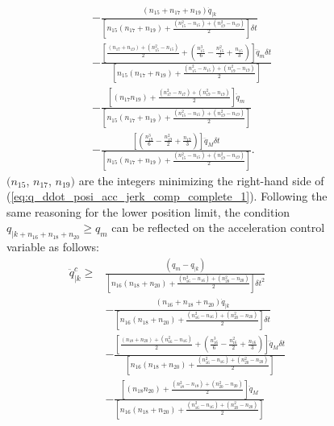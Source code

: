 \begin{figure}[!htbp]
\begin{equation}
\begin{split}
&- \frac{\left(n_{15}+n_{17}+n_{19}\right)\dot{q}_{|k}}{\left[n_{15}\left(n_{17}+n_{19}\right)+\frac{\left(n_{15}^2-n_{15}\right)+\left(n_{19}^2-n_{19}\right)}{2}\right]\delta t} \\
&- \frac{\left[\frac{\left(n_{17}+n_{19}\right)+\left(n_{15}^2-n_{15}\right)}{2}+\left(\frac{n_{15}^3}{6}-\frac{n_{15}^2}{2}+\frac{n_{15}}{3}\right)\right]\dddot{q}_{m} \delta t}{\left[n_{15}\left(n_{17}+n_{19}\right)+\frac{\left(n_{15}^2-n_{15}\right)+\left(n_{19}^2-n_{19}\right)}{2}\right]} \\
&- \frac{\left[\left(n_{17} n_{19}\right)+\frac{\left(n_{17}^2-n_{17}\right)+\left(n_{19}^2-n_{19}\right)}{2}\right]\ddot{q}_{m}}{\left[n_{15}\left(n_{17}+n_{19}\right)+\frac{\left(n_{15}^2-n_{15}\right)+\left(n_{19}^2-n_{19}\right)}{2}\right]} \\
&- \frac{\left[\left(\frac{n_{19}^3}{6}-\frac{n_{19}^2}{2}+\frac{n_{19}}{3}\right)\right]\dddot{q}_{M} \delta t}{\left[n_{15}\left(n_{17}+n_{19}\right)+\frac{\left(n_{15}^2-n_{15}\right)+\left(n_{19}^2-n_{19}\right)}{2}\right]}.
\end{split}
\label{eq:q_ddot_posi_acc_jerk_comp_complete_1}
\end{equation} 
$(n_{15}$, $n_{17}$, $n_{19})$ are the integers minimizing the right-hand side of (\ref{eq:q_ddot_posi_acc_jerk_comp_complete_1}).
Following the same reasoning for the lower position limit, the condition $q_{|k+n_{16}+n_{18}+n_{20}} \geq q_{m}$ can be reflected on the acceleration control variable as follows:
\begin{equation}
\begin{split}
\ddot{q}_{|k}^{c} \geq &\frac{\left(q_{m}-q_{|k}\right)}{\left[n_{16}\left(n_{18}+n_{20}\right)+\frac{\left(n_{16}^2-n_{16}\right)+\left(n_{20}^2-n_{20}\right)}{2}\right]\delta t^2} \\
&- \frac{\left(n_{16}+n_{18}+n_{20}\right)\dot{q}_{|k}}{\left[n_{16}\left(n_{18}+n_{20}\right)+\frac{\left(n_{16}^2-n_{16}\right)+\left(n_{20}^2-n_{20}\right)}{2}\right]\delta t} \\
&- \frac{\left[\frac{\left(n_{18}+n_{20}\right)+\left(n_{16}^2-n_{16}\right)}{2}+\left(\frac{n_{16}^3}{6}-\frac{n_{16}^2}{2}+\frac{n_{16}}{3}\right)\right]\dddot{q}_{M} \delta t}{\left[n_{16}\left(n_{18}+n_{20}\right)+\frac{\left(n_{16}^2-n_{16}\right)+\left(n_{20}^2-n_{20}\right)}{2}\right]} \\
&- \frac{\left[\left(n_{18} n_{20}\right)+\frac{\left(n_{18}^2-n_{18}\right)+\left(n_{20}^2-n_{20}\right)}{2}\right]\ddot{q}_{M}}{\left[n_{16}\left(n_{18}+n_{20}\right)+\frac{\left(n_{16}^2-n_{16}\right)+\left(n_{20}^2-n_{20}\right)}{2}\right]} \\

\end{split}
\end{equation}
\end{figure}
